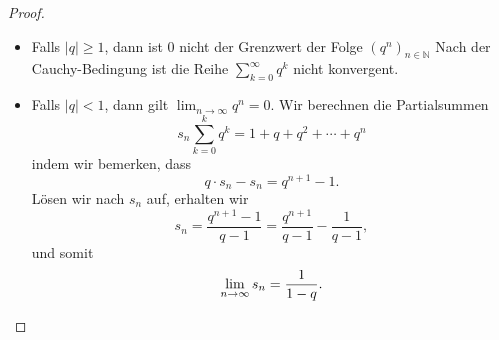\documentclass[../main.tex]{subfiles}
\begin{document}
\begin{proof}
  \leavevmode
  \begin{itemize}
    \item Falls $|q| \geq 1$, dann ist $0$ nicht
      der Grenzwert der Folge ${(q^n)}_{n \in \mathbb{N}}$ 
      Nach der Cauchy-Bedingung ist die Reihe
      $\sum_{k=0}^{\infty} q^k$ nicht konvergent.
    \item Falls $|q|<1$, dann gilt
      $\lim_{n \to \infty} q^n = 0$. Wir berechnen
      die Partialsummen
      \[
        s_n  \sum_{k=0}^{k} q^k 
            = 1 + q + q^2 + \cdots + q^n
      \]
      indem wir bemerken, dass
      \[
        q \cdot s_n - s_n = q^{n+1} - 1.
      \]
      Lösen wir nach $s_n$ auf, erhalten wir
      \[
        s_n = \frac{q^{n+1} - 1}{q - 1}
        = \frac{q^{n+1}}{q-1} - \frac{1}{q-1},
      \]
      und somit
      \[
        \lim_{n \to \infty} s_n = \frac{1}{1-q}. \qedhere
      \]
  \end{itemize}
\end{proof}
\end{document}
